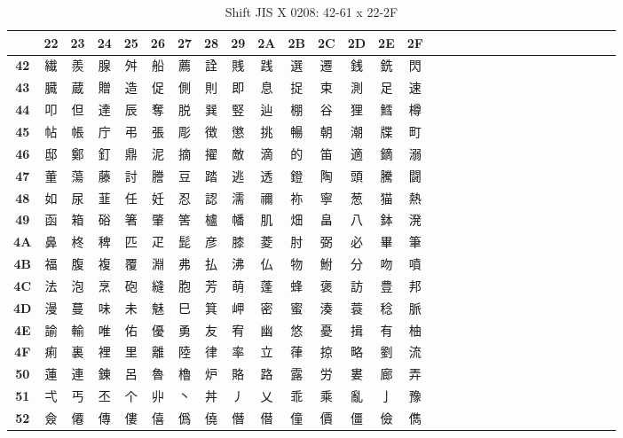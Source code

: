 \begin{table}[H]
\Fontified
\centering
\caption{Shift JIS X 0208: 42-61 x 22-2F}
\begin{tabular}{|Sc|Sc|Sc|Sc|Sc|Sc|Sc|Sc|Sc|Sc|Sc|Sc|Sc|Sc|Sc|}
\hline
 & \textbf{22} & \textbf{23} & \textbf{24} & \textbf{25} & \textbf{26} & \textbf{27} & \textbf{28} & \textbf{29} & \textbf{2A} & \textbf{2B} & \textbf{2C} & \textbf{2D} & \textbf{2E} & \textbf{2F} \\ \hline
\textbf{42} & 繊 & 羨 & 腺 & 舛 & 船 & 薦 & 詮 & 賎 & 践 & 選 & 遷 & 銭 & 銑 & 閃 \\ \hline
\textbf{43} & 臓 & 蔵 & 贈 & 造 & 促 & 側 & 則 & 即 & 息 & 捉 & 束 & 測 & 足 & 速 \\ \hline
\textbf{44} & 叩 & 但 & 達 & 辰 & 奪 & 脱 & 巽 & 竪 & 辿 & 棚 & 谷 & 狸 & 鱈 & 樽 \\ \hline
\textbf{45} & 帖 & 帳 & 庁 & 弔 & 張 & 彫 & 徴 & 懲 & 挑 & 暢 & 朝 & 潮 & 牒 & 町 \\ \hline
\textbf{46} & 邸 & 鄭 & 釘 & 鼎 & 泥 & 摘 & 擢 & 敵 & 滴 & 的 & 笛 & 適 & 鏑 & 溺 \\ \hline
\textbf{47} & 董 & 蕩 & 藤 & 討 & 謄 & 豆 & 踏 & 逃 & 透 & 鐙 & 陶 & 頭 & 騰 & 闘 \\ \hline
\textbf{48} & 如 & 尿 & 韮 & 任 & 妊 & 忍 & 認 & 濡 & 禰 & 祢 & 寧 & 葱 & 猫 & 熱 \\ \hline
\textbf{49} & 函 & 箱 & 硲 & 箸 & 肇 & 筈 & 櫨 & 幡 & 肌 & 畑 & 畠 & 八 & 鉢 & 溌 \\ \hline
\textbf{4A} & 鼻 & 柊 & 稗 & 匹 & 疋 & 髭 & 彦 & 膝 & 菱 & 肘 & 弼 & 必 & 畢 & 筆 \\ \hline
\textbf{4B} & 福 & 腹 & 複 & 覆 & 淵 & 弗 & 払 & 沸 & 仏 & 物 & 鮒 & 分 & 吻 & 噴 \\ \hline
\textbf{4C} & 法 & 泡 & 烹 & 砲 & 縫 & 胞 & 芳 & 萌 & 蓬 & 蜂 & 褒 & 訪 & 豊 & 邦 \\ \hline
\textbf{4D} & 漫 & 蔓 & 味 & 未 & 魅 & 巳 & 箕 & 岬 & 密 & 蜜 & 湊 & 蓑 & 稔 & 脈 \\ \hline
\textbf{4E} & 諭 & 輸 & 唯 & 佑 & 優 & 勇 & 友 & 宥 & 幽 & 悠 & 憂 & 揖 & 有 & 柚 \\ \hline
\textbf{4F} & 痢 & 裏 & 裡 & 里 & 離 & 陸 & 律 & 率 & 立 & 葎 & 掠 & 略 & 劉 & 流 \\ \hline
\textbf{50} & 蓮 & 連 & 錬 & 呂 & 魯 & 櫓 & 炉 & 賂 & 路 & 露 & 労 & 婁 & 廊 & 弄 \\ \hline
\textbf{51} & 弌 & 丐 & 丕 & 个 & 丱 & 丶 & 丼 & 丿 & 乂 & 乖 & 乘 & 亂 & 亅 & 豫 \\ \hline
\textbf{52} & 僉 & 僊 & 傳 & 僂 & 僖 & 僞 & 僥 & 僭 & 僣 & 僮 & 價 & 僵 & 儉 & 儁 \\ \hline

\end{tabular}
\end{table}
